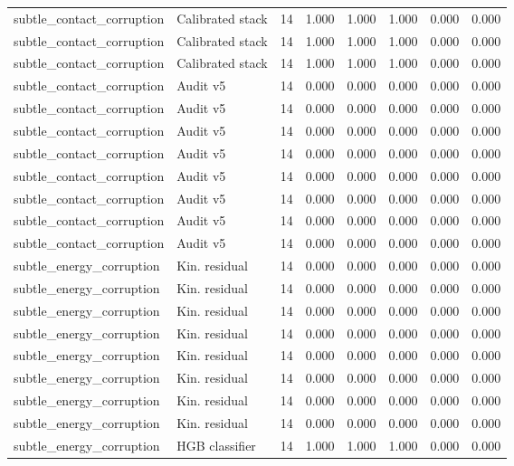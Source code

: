 {\begin{longtable}{llrrrrrr}
subtle\_contact\_corruption & Calibrated stack & 14 & 1.000 & 1.000 & 1.000 & 0.000 & 0.000 \\
subtle\_contact\_corruption & Calibrated stack & 14 & 1.000 & 1.000 & 1.000 & 0.000 & 0.000 \\
subtle\_contact\_corruption & Calibrated stack & 14 & 1.000 & 1.000 & 1.000 & 0.000 & 0.000 \\
subtle\_contact\_corruption & Audit v5 & 14 & 0.000 & 0.000 & 0.000 & 0.000 & 0.000 \\
subtle\_contact\_corruption & Audit v5 & 14 & 0.000 & 0.000 & 0.000 & 0.000 & 0.000 \\
subtle\_contact\_corruption & Audit v5 & 14 & 0.000 & 0.000 & 0.000 & 0.000 & 0.000 \\
subtle\_contact\_corruption & Audit v5 & 14 & 0.000 & 0.000 & 0.000 & 0.000 & 0.000 \\
subtle\_contact\_corruption & Audit v5 & 14 & 0.000 & 0.000 & 0.000 & 0.000 & 0.000 \\
subtle\_contact\_corruption & Audit v5 & 14 & 0.000 & 0.000 & 0.000 & 0.000 & 0.000 \\
subtle\_contact\_corruption & Audit v5 & 14 & 0.000 & 0.000 & 0.000 & 0.000 & 0.000 \\
subtle\_contact\_corruption & Audit v5 & 14 & 0.000 & 0.000 & 0.000 & 0.000 & 0.000 \\
subtle\_energy\_corruption & Kin. residual & 14 & 0.000 & 0.000 & 0.000 & 0.000 & 0.000 \\
subtle\_energy\_corruption & Kin. residual & 14 & 0.000 & 0.000 & 0.000 & 0.000 & 0.000 \\
subtle\_energy\_corruption & Kin. residual & 14 & 0.000 & 0.000 & 0.000 & 0.000 & 0.000 \\
subtle\_energy\_corruption & Kin. residual & 14 & 0.000 & 0.000 & 0.000 & 0.000 & 0.000 \\
subtle\_energy\_corruption & Kin. residual & 14 & 0.000 & 0.000 & 0.000 & 0.000 & 0.000 \\
subtle\_energy\_corruption & Kin. residual & 14 & 0.000 & 0.000 & 0.000 & 0.000 & 0.000 \\
subtle\_energy\_corruption & Kin. residual & 14 & 0.000 & 0.000 & 0.000 & 0.000 & 0.000 \\
subtle\_energy\_corruption & Kin. residual & 14 & 0.000 & 0.000 & 0.000 & 0.000 & 0.000 \\
subtle\_energy\_corruption & HGB classifier & 14 & 1.000 & 1.000 & 1.000 & 0.000 & 0.000 \\

\end{longtable}}
